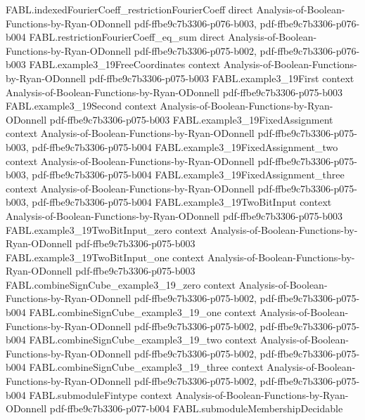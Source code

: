 \begin{theorem}
  {FABL.indexedFourierCoeff_restrictionFourierCoeff}
  {direct}
  {Analysis-of-Boolean-Functions-by-Ryan-ODonnell}
  {pdf-ffbe9c7b3306-p076-b003,
    pdf-ffbe9c7b3306-p076-b004}
\proofstep
  {FABL.restrictionFourierCoeff_eq_sum}
  {direct}
  {Analysis-of-Boolean-Functions-by-Ryan-ODonnell}
  {pdf-ffbe9c7b3306-p075-b002,
    pdf-ffbe9c7b3306-p076-b003}
\proofstep
  {FABL.example3_19FreeCoordinates}
  {context}
  {Analysis-of-Boolean-Functions-by-Ryan-ODonnell}
  {pdf-ffbe9c7b3306-p075-b003}
\proofstep
  {FABL.example3_19First}
  {context}
  {Analysis-of-Boolean-Functions-by-Ryan-ODonnell}
  {pdf-ffbe9c7b3306-p075-b003}
\proofstep
  {FABL.example3_19Second}
  {context}
  {Analysis-of-Boolean-Functions-by-Ryan-ODonnell}
  {pdf-ffbe9c7b3306-p075-b003}
\proofstep
  {FABL.example3_19FixedAssignment}
  {context}
  {Analysis-of-Boolean-Functions-by-Ryan-ODonnell}
  {pdf-ffbe9c7b3306-p075-b003,
    pdf-ffbe9c7b3306-p075-b004}
\proofstep
  {FABL.example3_19FixedAssignment_two}
  {context}
  {Analysis-of-Boolean-Functions-by-Ryan-ODonnell}
  {pdf-ffbe9c7b3306-p075-b003,
    pdf-ffbe9c7b3306-p075-b004}
\proofstep
  {FABL.example3_19FixedAssignment_three}
  {context}
  {Analysis-of-Boolean-Functions-by-Ryan-ODonnell}
  {pdf-ffbe9c7b3306-p075-b003,
    pdf-ffbe9c7b3306-p075-b004}
\proofstep
  {FABL.example3_19TwoBitInput}
  {context}
  {Analysis-of-Boolean-Functions-by-Ryan-ODonnell}
  {pdf-ffbe9c7b3306-p075-b003}
\proofstep
  {FABL.example3_19TwoBitInput_zero}
  {context}
  {Analysis-of-Boolean-Functions-by-Ryan-ODonnell}
  {pdf-ffbe9c7b3306-p075-b003}
\proofstep
  {FABL.example3_19TwoBitInput_one}
  {context}
  {Analysis-of-Boolean-Functions-by-Ryan-ODonnell}
  {pdf-ffbe9c7b3306-p075-b003}
\proofstep
  {FABL.combineSignCube_example3_19_zero}
  {context}
  {Analysis-of-Boolean-Functions-by-Ryan-ODonnell}
  {pdf-ffbe9c7b3306-p075-b002,
    pdf-ffbe9c7b3306-p075-b004}
\proofstep
  {FABL.combineSignCube_example3_19_one}
  {context}
  {Analysis-of-Boolean-Functions-by-Ryan-ODonnell}
  {pdf-ffbe9c7b3306-p075-b002,
    pdf-ffbe9c7b3306-p075-b004}
\proofstep
  {FABL.combineSignCube_example3_19_two}
  {context}
  {Analysis-of-Boolean-Functions-by-Ryan-ODonnell}
  {pdf-ffbe9c7b3306-p075-b002,
    pdf-ffbe9c7b3306-p075-b004}
\proofstep
  {FABL.combineSignCube_example3_19_three}
  {context}
  {Analysis-of-Boolean-Functions-by-Ryan-ODonnell}
  {pdf-ffbe9c7b3306-p075-b002,
    pdf-ffbe9c7b3306-p075-b004}
\proofstep
  {FABL.submoduleFintype}
  {context}
  {Analysis-of-Boolean-Functions-by-Ryan-ODonnell}
  {pdf-ffbe9c7b3306-p077-b004}
\proofstep
  {FABL.submoduleMembershipDecidable}

\end{theorem}
